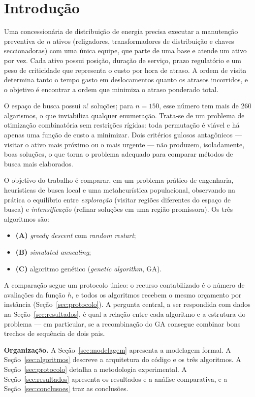 \section{Introdução}

Uma concessionária de distribuição de energia precisa executar a manutenção preventiva de $n$ ativos (religadores, transformadores de distribuição e chaves seccionadoras) com uma única equipe, que parte de uma base e atende um ativo por vez. Cada ativo possui posição, duração de serviço, prazo regulatório e um peso de criticidade que representa o custo por hora de atraso. A ordem de visita determina tanto o tempo gasto em deslocamentos quanto os atrasos incorridos, e o objetivo é encontrar a ordem que minimiza o atraso ponderado total.

O espaço de busca possui $n!$ soluções; para $n=150$, esse número tem mais de 260 algarismos, o que inviabiliza qualquer enumeração. Trata-se de um problema de otimização combinatória sem restrições rígidas: toda permutação é viável e há apenas uma função de custo a minimizar. Dois critérios gulosos antagônicos --- visitar o ativo mais próximo ou o mais urgente --- não produzem, isoladamente, boas soluções, o que torna o problema adequado para comparar métodos de busca mais elaborados.

O objetivo do trabalho é comparar, em um problema prático de engenharia, heurísticas de busca local e uma metaheurística populacional, observando na prática o equilíbrio entre \textit{exploração} (visitar regiões diferentes do espaço de busca) e \textit{intensificação} (refinar soluções em uma região promissora). Os três algoritmos são:

\begin{itemize}
  \item \textbf{(A)} \textit{greedy descent} com \textit{random restart};
  \item \textbf{(B)} \textit{simulated annealing};
  \item \textbf{(C)} algoritmo genético (\textit{genetic algorithm}, GA).
\end{itemize}

A comparação segue um protocolo único: o recurso contabilizado é o número de avaliações da função $h$, e todos os algoritmos recebem o mesmo orçamento por instância (Seção~\ref{sec:protocolo}). A pergunta central, a ser respondida com dados na Seção~\ref{sec:resultados}, é qual a relação entre cada algoritmo e a estrutura do problema --- em particular, se a recombinação do GA consegue combinar bons trechos de sequência de dois pais.

\textbf{Organização.} A Seção~\ref{sec:modelagem} apresenta a modelagem formal. A Seção~\ref{sec:algoritmos} descreve a arquitetura do código e os três algoritmos. A Seção~\ref{sec:protocolo} detalha a metodologia experimental. A Seção~\ref{sec:resultados} apresenta os resultados e a análise comparativa, e a Seção~\ref{sec:conclusoes} traz as conclusões.